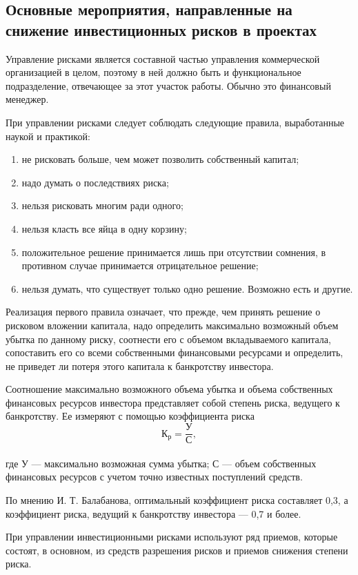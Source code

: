 \subsection{Основные мероприятия, направленные на снижение инвестиционных рисков в проектах}

Управление рисками является составной частью управления коммерческой организацией в целом, поэтому в ней должно быть и функциональное подразделение, отвечающее за этот участок работы.
Обычно это финансовый менеджер.

При управлении рисками следует соблюдать следующие правила, выработанные наукой и практикой:
\begin{enumerate}
	\setlength\itemsep{0pt}
	\item не рисковать больше, чем может позволить собственный капитал;
	\item надо думать о последствиях риска;
	\item нельзя рисковать многим ради одного;
	\item нельзя класть все яйца в одну корзину;
	\item положительное решение принимается лишь при отсутствии сомнения, в противном случае принимается отрицательное решение;
	\item нельзя думать, что существует только одно решение. Возможно есть и другие.
\end{enumerate}

Реализация первого правила означает, что прежде, чем принять решение о рисковом вложении капитала, надо определить максимально возможный объем убытка по данному риску, соотнести его с объемом вкладываемого капитала, сопоставить его со всеми собственными финансовыми ресурсами и определить, не приведет ли потеря этого капитала к банкротству инвестора.

Соотношение максимально возможного объема убытка и объема собственных финансовых ресурсов инвестора представляет собой степень риска, ведущего к банкротству.
Ее измеряют с помощью коэффициента риска \cite[241]{sergeev}
\[ \text{К}_\text{р} = \frac{\text{У}}{\text{С}}, \]\\
где У --- максимально возможная сумма убытка; С --- объем собственных финансовых ресурсов с учетом точно известных поступлений средств.

По мнению И. Т. Балабанова, оптимальный коэффициент риска составляет 0,3, а коэффициент риска, ведущий к банкротству инвестора --- 0,7 и более.

При управлении инвестиционными рисками используют ряд приемов, которые состоят, в основном, из средств разрешения рисков и приемов снижения степени риска.

